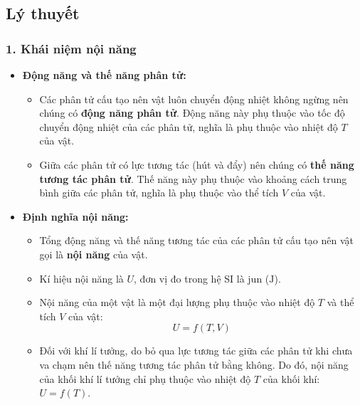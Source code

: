 

\subsection{Lý thuyết}
\subsubsection{1. Khái niệm nội năng}

\begin{itemize}
    \item \textbf{Động năng và thế năng phân tử:}
    \begin{itemize}
        \item Các phân tử cấu tạo nên vật luôn chuyển động nhiệt không ngừng nên chúng có \textbf{động năng phân tử}. Động năng này phụ thuộc vào tốc độ chuyển động nhiệt của các phân tử, nghĩa là phụ thuộc vào nhiệt độ $T$ của vật.
        \item Giữa các phân tử có lực tương tác (hút và đẩy) nên chúng có \textbf{thế năng tương tác phân tử}. Thế năng này phụ thuộc vào khoảng cách trung bình giữa các phân tử, nghĩa là phụ thuộc vào thể tích $V$ của vật.
    \end{itemize}
    \item \textbf{Định nghĩa nội năng:}
    \begin{itemize}
        \item Tổng động năng và thế năng tương tác của các phân tử cấu tạo nên vật gọi là \textbf{nội năng} của vật.
        \item Kí hiệu nội năng là $U$, đơn vị đo trong hệ SI là jun ($\mathrm{J}$).
        \item Nội năng của một vật là một đại lượng phụ thuộc vào nhiệt độ $T$ và thể tích $V$ của vật:
        \[
        U = f(T, V)
        \]
        \item Đối với khí lí tưởng, do bỏ qua lực tương tác giữa các phân tử khi chưa va chạm nên thế năng tương tác phân tử bằng không. Do đó, nội năng của khối khí lí tưởng chỉ phụ thuộc vào nhiệt độ $T$ của khối khí: $U = f(T)$.
    \end{itemize}
\end{itemize}

